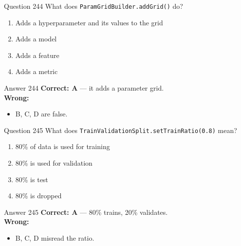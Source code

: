 \documentclass[aspectratio=169,11pt]{beamer}
\begin{document}
	\begin{frame}{Question 244}
		What does \texttt{ParamGridBuilder.addGrid()} do?
		\begin{enumerate}[label=\Alph*.]
			\item Adds a hyperparameter and its values to the grid
			\item Adds a model
			\item Adds a feature
			\item Adds a metric
		\end{enumerate}
	\end{frame}
	\begin{frame}{Answer 244}
		\textbf{Correct: A} --- it adds a parameter grid.\\
		\vspace{0.5em}
		\textbf{Wrong:}
		\begin{itemize}
			\item B, C, D are false.
		\end{itemize}
	\end{frame}
	
	\begin{frame}{Question 245}
		What does \texttt{TrainValidationSplit.setTrainRatio(0.8)} mean?
		\begin{enumerate}[label=\Alph*.]
			\item 80\% of data is used for training
			\item 80\% is used for validation
			\item 80\% is test
			\item 80\% is dropped
		\end{enumerate}
	\end{frame}
	\begin{frame}{Answer 245}
		\textbf{Correct: A} --- 80\% trains, 20\% validates.\\
		\vspace{0.5em}
		\textbf{Wrong:}
		\begin{itemize}
			\item B, C, D misread the ratio.
		\end{itemize}
	\end{frame}
	
\end{document}
